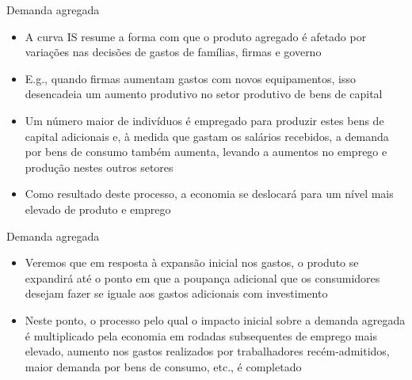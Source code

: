 \documentclass[10pt]{beamer}
\begin{document}
\begin{frame}{Demanda agregada}
    \begin{itemize}
        \item A curva IS resume a forma com que o produto agregado é afetado por variações nas decisões de gastos de famílias, firmas e governo\bigskip
         
        \item E.g., quando firmas aumentam gastos com novos equipamentos, isso desencadeia um aumento produtivo no setor produtivo de bens de capital\bigskip
         
        \item Um número maior de indivíduos é empregado para produzir estes bens de capital adicionais e, à medida que gastam os salários recebidos, a demanda por bens de consumo também aumenta, levando a aumentos no emprego e produção nestes outros setores\bigskip
         
        \item Como resultado deste processo, a economia se deslocará para um nível mais elevado de produto e emprego
    \end{itemize}
\end{frame}

\begin{frame}{Demanda agregada}
    \begin{itemize}
    \item Veremos que em resposta à expansão inicial nos gastos, o produto se expandirá até o ponto em que a poupança adicional que os consumidores desejam fazer se iguale aos gastos adicionais com investimento\bigskip
     
    \item Neste ponto, o processo pelo qual o impacto inicial sobre a demanda agregada é multiplicado pela economia em rodadas subsequentes de emprego mais elevado, aumento nos gastos realizados por trabalhadores recém-admitidos, maior demanda por bens de consumo, etc., é completado
    \end{itemize}
\end{frame}
\end{document}
